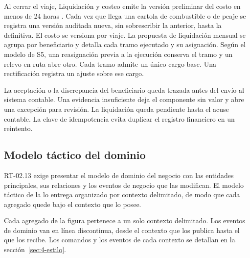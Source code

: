 
Al cerrar el viaje, Liquidación y costeo emite la versión preliminar del costo en menos de 24 horas
. Cada vez que llega una cartola de combustible o de peaje se registra una versión
auditada nueva, sin sobrescribir la anterior, hasta la definitiva. El costo se versiona por viaje.
La propuesta de liquidación mensual se agrupa por beneficiario y detalla cada tramo ejecutado y su
asignación. Según el modelo de S5, una reasignación previa a la ejecución conserva el tramo y un
relevo en ruta abre otro. Cada tramo admite un único cargo base. Una rectificación registra un
ajuste sobre ese cargo.

La aceptación o la discrepancia del beneficiario queda trazada antes del envío al sistema contable.
Una evidencia insuficiente deja el componente sin valor y abre una excepción para revisión. La
liquidación queda pendiente hasta el acuse contable. La clave de idempotencia evita duplicar el
registro financiero en un reintento.

\subsection{Modelo táctico del dominio}\label{sec:4-tactico}

RT-02.13 exige presentar el modelo de dominio del negocio con las entidades principales, sus relaciones
y los eventos de negocio que las modifican. El modelo táctico de la  lo entrega
organizado por contexto delimitado, de modo que cada agregado quede bajo el contexto que lo posee.


Cada agregado de la figura pertenece a un solo contexto delimitado. Los eventos de dominio van en línea
discontinua, desde el contexto que los publica hasta el que los recibe. Los comandos y los eventos de
cada contexto se detallan en la sección~\ref{sec:4-estilo}.

